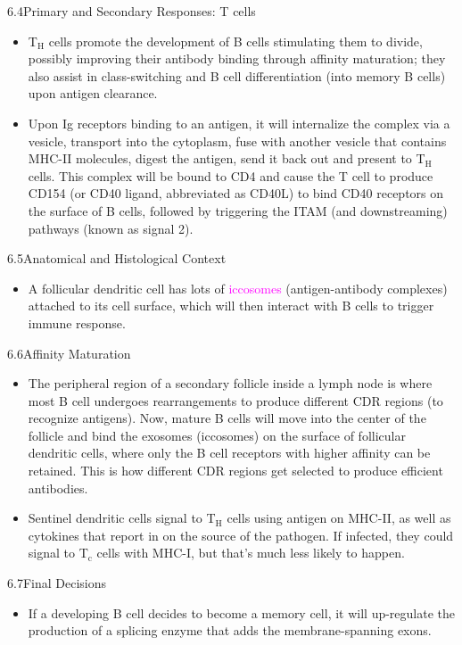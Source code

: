\documentclass[UTF8]{book}
\newcommand{\pink}[1]{\textcolor{magenta}{#1}}
\begin{document}
6.4\quad Primary and Secondary Responses: T cells
\begin{itemize}
\item T$_\mathrm{H}$ cells promote the development of B cells stimulating them to divide, possibly improving their antibody binding through affinity maturation; they also assist in class-switching and B cell differentiation (into memory B cells) upon antigen clearance.
\item Upon Ig receptors binding to an antigen, it will internalize the complex via a vesicle, transport into the cytoplasm, fuse with another vesicle that contains MHC-II molecules, digest the antigen, send it back out and present to T$_\mathrm{H}$ cells. This complex will be bound to CD4 and cause the T cell to produce CD154 (or CD40 ligand, abbreviated as CD40L) to bind CD40 receptors on the surface of B cells, followed by triggering the ITAM (and downstreaming) pathways (known as signal 2).
\end{itemize}
6.5\quad Anatomical and Histological Context
\begin{itemize}
\item A follicular dendritic cell has lots of \pink{iccosomes} (antigen-antibody complexes) attached to its cell surface, which will then interact with B cells to trigger immune response.
\end{itemize}
6.6\quad Affinity Maturation
\begin{itemize}
\item The peripheral region of a secondary follicle inside a lymph node is where most B cell undergoes rearrangements to produce different CDR regions (to recognize antigens). Now, mature B cells will move into the center of the follicle and bind the exosomes (iccosomes) on the surface of follicular dendritic cells, where only the B cell receptors with higher affinity can be retained. This is how different CDR regions get selected to produce efficient antibodies.
\item Sentinel dendritic cells signal to T$_\mathrm{H}$ cells using antigen on MHC-II, as well as cytokines that report in on the source of the pathogen. If infected, they could signal to T$_\mathrm{c}$ cells with MHC-I, but that’s much less likely to happen.
\end{itemize}
6.7\quad Final Decisions
\begin{itemize}
\item If a developing B cell decides to become a memory cell, it will up-regulate the production of a splicing enzyme that adds the membrane-spanning exons.
\end{itemize}
\end{document}
